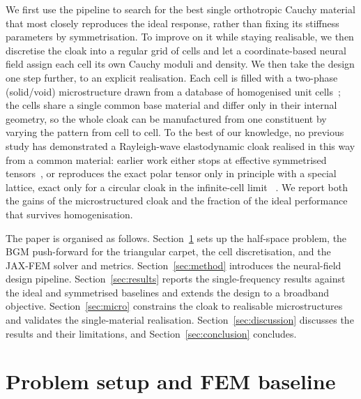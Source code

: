 \documentclass[preprint,12pt]{elsarticle}
\begin{document}
We first use the pipeline to search for the best
single orthotropic Cauchy material that most closely reproduces the ideal
response, rather than fixing its stiffness parameters by symmetrisation. To improve on it while
staying realisable, we then discretise the cloak into a regular grid of
cells and let a coordinate-based neural field assign each cell its own
Cauchy moduli and density. We then take the design one step further, to an explicit realisation. Each
cell is filled with a two-phase (solid/void) microstructure drawn from a
database of homogenised unit cells~\citep{nakarmi2024}; the cells share a
single common base material and differ only in their internal geometry, so
the whole cloak can be manufactured from one constituent by varying the
pattern from cell to cell. 
To the best of our knowledge, no previous study has demonstrated a Rayleigh-wave elastodynamic cloak realised in this way from a common material: earlier work either stops at effective symmetrised
tensors~\citep{chatzopoulos2023}, or reproduces the exact polar tensor only
in principle with a special lattice, exact only for a circular cloak 
in the infinite-cell limit ~\citep{nassar2018}. 
We report both the gains of the microstructured cloak and the fraction 
of the ideal performance that survives homogenisation.

The paper is organised as follows. Section~\ref{sec:setup} sets up the
half-space problem, the BGM push-forward for the triangular carpet, the
cell discretisation, and the JAX-FEM solver and metrics.
Section~\ref{sec:method} introduces the neural-field design pipeline.
Section~\ref{sec:results} reports the single-frequency results against the
ideal and symmetrised baselines and extends the
design to a broadband objective. Section~\ref{sec:micro} constrains the
cloak to realisable microstructures and validates the single-material
realisation. Section~\ref{sec:discussion} discusses the results and their
limitations, and Section~\ref{sec:conclusion} concludes.

\section{Problem setup and FEM baseline}\label{sec:setup}
\end{document}

